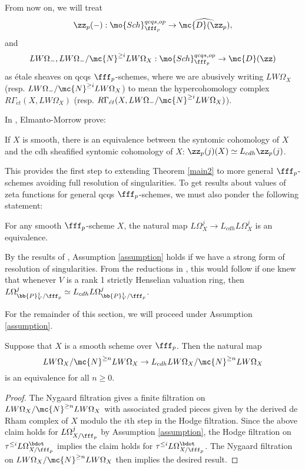 From now on, we will treat $$\zz_p(-):\mo{Sch}^{qcqs,op}_{\fff_p}\to\widehat{\mc{D}(\zz_p)},$$ and $$LW\Omega_{-},LW\Omega_{-}/\mc{N}^{\geq i}LW\Omega_{X}:\mo{Sch}^{qcqs,op}_{\fff_p}\to \mc{D}(\zz)$$ as \'{e}tale sheaves on qcqs $\fff_p$-schemes, where we are abusively writing $LW\Omega_{X}$ (resp. $LW\Omega_{-}/\mc{N}^{\geq i}LW\Omega_{X}$) to mean the hypercohomology complex $R\Gamma_{\acute{e}t}(X,LW\Omega_{X})$ (resp. $R\Gamma_{\acute{e}t}(X,LW\Omega_{-}/\mc{N}^{\geq i}LW\Omega_{X})$).

In \cite[Corollary~6.5]{elmanto2023motivic}, Elmanto-Morrow prove:
\begin{proposition}
If $X$ is smooth, there is an equivalence between the syntomic cohomology of $X$ and the cdh sheafified syntomic cohomology of $X$: $\zz_p(j)(X)\simeq L_{cdh}\zz_p(j)$.
\end{proposition}
This provides the first step to extending Theorem \ref{main2} to more general $\fff_p$-schemes avoiding full resolution of singularities.  To get results about values of zeta functions for general qcqs $\fff_p$-schemes, we must also ponder the following statement:
\begin{assumption}\label{assumption}
For any smooth $\fff_p$-scheme $X$, the natural map $L\Omega^j_{X}\to L_{cdh}L\Omega^j_{X}$ is an equivalence.
\end{assumption}
\begin{remark}
By the results of \cite{geisser2005arithmetic}, Assumption \ref{assumption} holds if we have a strong form of resolution of singularities.  From the reductions in \cite{elmanto2023motivic}, this would follow if one knew that whenever $V$ is a rank 1 strictly Henselian valuation ring, then $L\Omega^j_{\bb{P}^1_{V}/\fff_p}\simeq L_{cdh}L\Omega^j_{\bb{P}^1_{V}/\fff_p}$. \end{remark}
For the remainder of this section, we will proceed under Assumption \ref{assumption}.
\begin{corollary}
Suppose that $X$ is a smooth scheme over $\fff_p$.  Then the natural map $$LW\Omega_{X}/\mc{N}^{\geq n}LW\Omega_X\to L_{cdh}LW\Omega_{X}/\mc{N}^{\geq n}LW\Omega_X$$ is an equivalence for all $n\geq 0$.
\end{corollary}
\begin{proof}
The Nygaard filtration gives a finite filtration on $LW\Omega_{X}/\mc{N}^{\geq n}LW\Omega_{X}$ with associated graded pieces given by the derived de Rham complex of $X$ modulo the $i$th step in the Hodge filtration.  Since the above claim holds for $L\Omega^j_{X/\fff_p}$  by Assumption \ref{assumption}, the Hodge filtration on $\tau^{\leq i}L\Omega_{X/\fff_p}^{\bdot}$ implies the claim holds for $\tau^{\leq i}L\Omega_{X/\fff_p}^{\bdot}$.  The Nygaard filtration on $LW\Omega_{X}/\mc{N}^{\geq n}LW\Omega_{X}$ then implies the desired result.
\end{proof}
